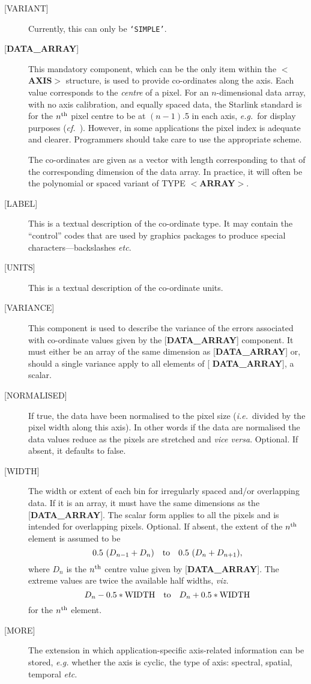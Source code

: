 \begin{description}
\item [{[}VARIANT{]}]
Currently, this can only be {\tt `SIMPLE'}.
\item [{[}{\bf DATA\_ARRAY}{]}]
This mandatory component, which
can be the only item within the $<${\bf AXIS}$>$ structure,
is used to provide co-ordinates along the axis.
Each value corresponds to the {\it centre} of a pixel.  For an
$n$-dimensional data array, with no axis calibration, and equally spaced
data, the Starlink standard is for the $n^{\rm th}$ pixel centre to be at
$(n-1)$.5 in each axis, {\it e.g.}\  for display purposes
({\it cf.}\  ). However, in some applications the pixel
index is adequate and clearer.  Programmers should take care to use
the appropriate scheme.

The co-ordinates are given as
a vector with length corresponding to that of the corresponding
dimension of the data array. In practice, it will often be
the polynomial or spaced variant of TYPE \mbox{$<${\bf ARRAY}$>$}.

\item [{[}LABEL{]}]
This is a textual description of the co-ordinate type.  It may
contain the ``control'' codes that are used by graphics packages
to produce special characters---backslashes {\it etc}.
\item [{[}UNITS{]}]
This is a textual description of the co-ordinate units.
\item [{[}VARIANCE{]}]
This component is used to describe the variance of the
errors associated with co-ordinate
values given by the {[}{\bf DATA\_ARRAY}{]} component.
It must either be an array of
the same dimension as {[}{\bf DATA\_ARRAY}{]} or,
should a single variance apply to all elements of {[}{\bf 
DATA\_ARRAY}{]},
a scalar.
\item [{[}NORMALISED{]}]
If true, the data have been normalised to the pixel size
({\it i.e.}\ divided by the pixel width along this axis).
In other words if the data are 
normalised the data values reduce as the pixels are stretched and {\it 
vice versa}. Optional. If absent, it defaults to false.
\item [{[}WIDTH{]}]
The width or extent of each bin for irregularly spaced
and/or overlapping data.
If it is an array, it must have
the same dimensions as the {[}{\bf DATA\_ARRAY}{]}.
The scalar form applies to all the pixels and is intended for overlapping
pixels.  Optional.  If absent, the extent of the $n^{\rm th}$
element is assumed to be
\[ 0.5~(D_{n-1}+D_n)~~~{\rm to}~~~0.5~(D_n+D_{n+1}) , \]
where $D_n$ is the $n^{\rm th}$ centre
value given by {[}{\bf DATA\_ARRAY}{]}. The
extreme values are twice the available half widths, {\it viz.}
\[ D_n - 0.5 * {\rm WIDTH} ~~~ {\rm to} ~~~ D_n + 0.5 * {\rm WIDTH} \]
for the $n^{\rm th}$ element.
\item [{[}MORE{]}] The extension in which application-specific
axis-related information can be stored,
{\it e.g.} whether the axis is cyclic, the type of axis: spectral,
spatial, temporal {\it etc.}
\end{description}

